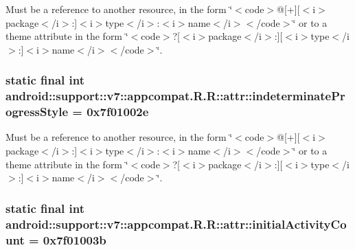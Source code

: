 Must be a reference to another resource, in the form \char`\"{}$<$code$>$@\mbox{[}+\mbox{]}\mbox{[}$<$i$>$package$<$/i$>$:\mbox{]}$<$i$>$type$<$/i$>$:$<$i$>$name$<$/i$>$$<$/code$>$\char`\"{} or to a theme attribute in the form \char`\"{}$<$code$>$?\mbox{[}$<$i$>$package$<$/i$>$:\mbox{]}\mbox{[}$<$i$>$type$<$/i$>$:\mbox{]}$<$i$>$name$<$/i$>$$<$/code$>$\char`\"{}. \hypertarget{classandroid_1_1support_1_1v7_1_1appcompat_1_1_r_1_1attr_e9bb96a8a2d374ec1a4ac02159707461}{
\subsubsection[{indeterminateProgressStyle}]{\setlength{\rightskip}{0pt plus 5cm}static final int android::support::v7::appcompat.R.R::attr::indeterminateProgressStyle = 0x7f01002e}}
\label{classandroid_1_1support_1_1v7_1_1appcompat_1_1_r_1_1attr_e9bb96a8a2d374ec1a4ac02159707461}


Must be a reference to another resource, in the form \char`\"{}$<$code$>$@\mbox{[}+\mbox{]}\mbox{[}$<$i$>$package$<$/i$>$:\mbox{]}$<$i$>$type$<$/i$>$:$<$i$>$name$<$/i$>$$<$/code$>$\char`\"{} or to a theme attribute in the form \char`\"{}$<$code$>$?\mbox{[}$<$i$>$package$<$/i$>$:\mbox{]}\mbox{[}$<$i$>$type$<$/i$>$:\mbox{]}$<$i$>$name$<$/i$>$$<$/code$>$\char`\"{}. \hypertarget{classandroid_1_1support_1_1v7_1_1appcompat_1_1_r_1_1attr_9db1d544b5416e2c1a37458600707093}{
\subsubsection[{initialActivityCount}]{\setlength{\rightskip}{0pt plus 5cm}static final int android::support::v7::appcompat.R.R::attr::initialActivityCount = 0x7f01003b}}
\label{classandroid_1_1support_1_1v7_1_1appcompat_1_1_r_1_1attr_9db1d544b5416e2c1a37458600707093}


